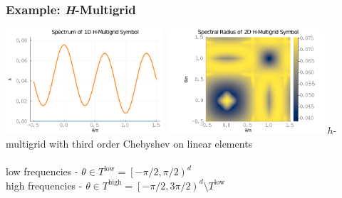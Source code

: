 \documentclass{beamer}
\begin{document}

\begin{frame}
\begin{center}
\frametitle{Example: {\textit H}-Multigrid}

\includegraphics[height=3.9cm]{../img/hmultigridSymbol1D}
\includegraphics[height=3.9cm]{../img/hmultigridSymbol2D}
{\small $h$-multigrid with third order Chebyshev on linear elements}\\

~\\

low frequencies - $\theta \in T^{\text{low}} = \left[ - \pi / 2, \pi / 2 \right)^d$\\

high frequencies - $\theta \in T^{\text{high}} = \left[ - \pi / 2, 3 \pi / 2 \right)^d \setminus T^{\text{low}}$

\end{center}
\end{frame}

\end{document}
